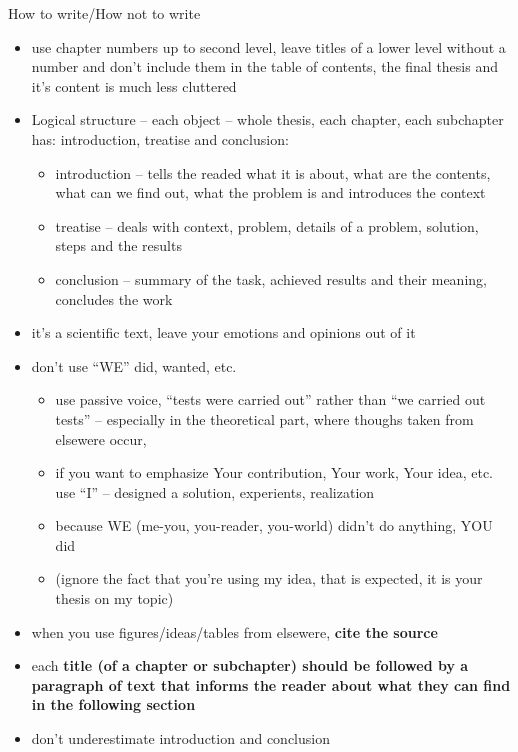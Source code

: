 How to write/How not to write
\begin{itemize}
  \item{use chapter numbers up to second level, leave titles of a lower level without a number and don't include them in the table of contents, the final thesis and it's content is much less cluttered}
  \item{Logical structure -- each object -- whole thesis, each chapter, each subchapter has: introduction, treatise and conclusion:
  	\begin{itemize}
  		\item{introduction -- tells the readed what it is about, what are the contents, what can we find out, what the problem is and introduces the context}
  		\item{treatise -- deals with context, problem, details of a problem, solution, steps and the results}
  		\item{conclusion -- summary of the task, achieved results and their meaning, concludes the work}
  	\end{itemize}
  }
  \item{it's a scientific text, leave your emotions and opinions out of it}
  \item{don't use ``WE'' did, wanted, etc.
    \begin{itemize}
      \item{use passive voice, ``tests were carried out'' rather than ``we carried out tests'' -- especially in the theoretical part, where thoughs taken from elsewere occur,}
      \item{if you want to emphasize Your contribution, Your work, Your idea, etc. use ``I'' -- designed a solution, experients, realization}
      \item{because WE (me-you, you-reader, you-world) didn't do anything, YOU did}
      \item{(ignore the fact that you're using my idea, that is expected, it is your thesis on my topic)}
    \end{itemize}}
  \item{when you use figures/ideas/tables from elsewere, \bf cite the source \rm}
  \item{each \bf title \rm (of a chapter or subchapter) should be followed by a paragraph of text that informs the reader about what they can find in the following section}
  \item{don't underestimate introduction and conclusion}
\end{itemize}


